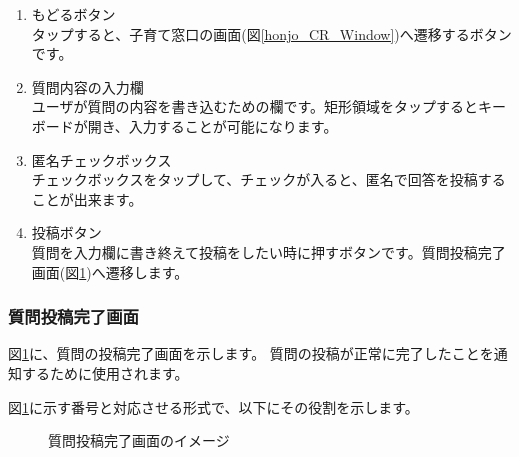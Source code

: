 \documentclass[a4j]{jarticle}
\begin{document}
\begin{enumerate}
  \renewcommand{\labelenumi}{\textcircled{\scriptsize \theenumi}}
  \item もどるボタン\\
        タップすると、子育て窓口の画面(図\ref{honjo_CR_Window})へ遷移するボタンです。
  \item 質問内容の入力欄\\
        ユーザが質問の内容を書き込むための欄です。矩形領域をタップするとキーボードが開き、入力することが可能になります。
  \item 匿名チェックボックス\\
        チェックボックスをタップして、チェックが入ると、匿名で回答を投稿することが出来ます。
  \item 投稿ボタン\\
        質問を入力欄に書き終えて投稿をしたい時に押すボタンです。質問投稿完了画面(図\ref{honjo_CR_CompleteContribution})へ遷移します。
\end{enumerate}


\newpage
\subsubsection{質問投稿完了画面}
図\ref{honjo_CR_CompleteContribution}に、質問の投稿完了画面を示します。
質問の投稿が正常に完了したことを通知するために使用されます。

図\ref{honjo_CR_CompleteContribution}に示す番号と対応させる形式で、以下にその役割を示します。

\begin{figure}[H]
    \begin{center}
    \caption {質問投稿完了画面のイメージ}
    \label{honjo_CR_CompleteContribution}
    \end{center}
\end{figure}
\end{document}
